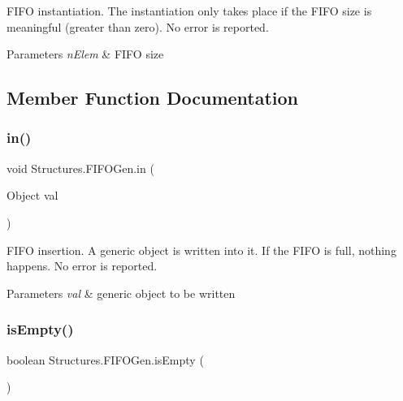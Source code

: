 F\+I\+FO instantiation. The instantiation only takes place if the F\+I\+FO size is meaningful (greater than zero). No error is reported.


\begin{DoxyParams}{Parameters}
{\em n\+Elem} & F\+I\+FO size \\
\hline
\end{DoxyParams}


\subsection{Member Function Documentation}
\mbox{\label{class_structures_1_1_f_i_f_o_gen_a8ec114330d8c542df57d58886ecb2196}} 
\subsubsection{\texorpdfstring{in()}{in()}}
{\footnotesize\ttfamily void Structures.\+F\+I\+F\+O\+Gen.\+in (\begin{DoxyParamCaption}\item[{Object}]{val }\end{DoxyParamCaption})}

F\+I\+FO insertion. A generic object is written into it. If the F\+I\+FO is full, nothing happens. No error is reported.


\begin{DoxyParams}{Parameters}
{\em val} & generic object to be written \\
\hline
\end{DoxyParams}
\mbox{\label{class_structures_1_1_f_i_f_o_gen_a55ae00dc84a01ec42237fa0ea8a088c5}} 
\subsubsection{\texorpdfstring{is\+Empty()}{isEmpty()}}
{\footnotesize\ttfamily boolean Structures.\+F\+I\+F\+O\+Gen.\+is\+Empty (\begin{DoxyParamCaption}{ }\end{DoxyParamCaption})}

